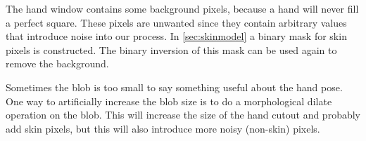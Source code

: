 \begin{figure}[htbp]
\begin{center}
\hspace{0.03\linewidth}
\hspace{0.03\linewidth}
\end{center}
\end{figure}

The hand window contains some background pixels, because a hand will never fill a perfect square. These pixels are unwanted since they contain arbitrary values that introduce noise into our process. In \autoref{sec:skinmodel} a binary mask for skin pixels is constructed. The binary inversion of this mask can be used again to remove the background.

Sometimes the blob is too small to say something useful about the hand pose. One way to artificially increase the blob size is to do a morphological dilate operation on the blob. This will increase the size of the hand cutout and probably add skin pixels, but this will also introduce more noisy (non-skin) pixels.

